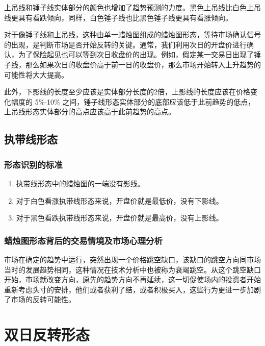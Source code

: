 上吊线和锤子线实体部分的颜色也增加了趋势预测的力度。黑色上吊线比白色上吊线更具有看跌倾向，同样，白色锤子线也比黑色锤子线更具有看涨倾向。

对于像锤子线和上吊线，这种由单一蜡烛图组成的蜡烛图形态，等待市场确认信号的出现，是判断市场是否开始反转的关键。通常，我们利用次日的开盘价进行确认，为了保险起见也可以等到次日收盘价的出现。例如，假定某一交易日出现了锤子线，那么如果次日的收盘价高于前一日的收盘价，那么市场开始转入上升趋势的可能性将大大提高。

此外，下影线的长度至少应该是实体部分长度的2倍，上影线的长度应该在价格变化幅度的 5\%-10\% 之间，锤子线形态实体部分的底部应该低于此前趋势的低点，上吊线形态实体部分的高点应该高于此前趋势的高点。
\subsection*{执带线形态}

\subsubsection*{形态识别的标准}
\begin{enumerate}
    \item 执带线形态中的蜡烛图的一端没有影线。
    \item 对于白色看涨执带线形态来说，开盘价就是最低价，没有下影线。
    \item 对于黑色看跌执带线形态来说，开盘价就是最高价，没有上影线。
\end{enumerate}
\subsubsection*{蜡烛图形态背后的交易情境及市场心理分析}
市场在确定的趋势中运行，突然出现一个价格跳空缺口，该缺口的跳空方向同市场当时的发展趋势相同，这种情况在技术分析中也被称为衰竭跳空。从这个跳空缺口开始，市场就改变方向，原先的趋势方向不再延续，这一切促使场内的投资者开始重新考虑头寸的安排，他们或者获利了结，或者积极买入，这些行为更进一步加剧了市场的反转可能性。
\section{双日反转形态}
